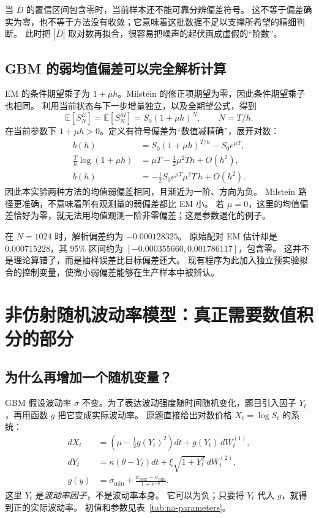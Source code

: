 \documentclass[11pt,a4paper,fontset=none]{ctexart}
\numberwithin{equation}{section}
\newcommand{\E}{\mathbb E}
\begin{document}
当 $\overline D$ 的置信区间包含零时，当前样本还不能可靠分辨偏差符号。
这不等于偏差确实为零，也不等于方法没有收敛；它意味着这批数据不足以支撑所希望的精细判断。
此时把 $|\overline D|$ 取对数再拟合，很容易把噪声的起伏画成虚假的“阶数”。

\subsection{GBM 的弱均值偏差可以完全解析计算}
EM 的条件期望乘子为 $1+\mu h$。Milstein 的修正项期望为零，因此条件期望乘子也相同。
利用当前状态与下一步增量独立，以及全期望公式，得到
\begin{equation}\label{eq:errors-discrete-mean}
 \E[S_N^{E}]=\E[S_N^{M}]=S_0(1+\mu h)^N,\qquad N=T/h.
\end{equation}
在当前参数下 $1+\mu h>0$。定义有符号偏差为“数值减精确”，展开对数：
\begin{align}
 b(h)&=S_0(1+\mu h)^{T/h}-S_0e^{\mu T},\label{eq:errors-bias-exact}\\
 \frac{T}{h}\log(1+\mu h)&=\mu T-\frac12\mu^2Th+O(h^2),\label{eq:errors-bias-log}\\
 b(h)&=-\frac12S_0e^{\mu T}\mu^2T\,h+O(h^2).\label{eq:errors-bias-order}
\end{align}
因此本实验两种方法的均值弱偏差相同，且渐近为一阶、方向为负。
Milstein 路径更准确，不意味着所有观测量的弱偏差都比 EM 小。
若 $\mu=0$，这里的均值偏差恰好为零，就无法用均值观测一阶非零偏差；这是参数退化的例子。

在 $N=1024$ 时，解析偏差约为 $-0.000128325$。
原始配对 EM 估计却是 $0.000715228$，其 95\% 区间约为 $[-0.000355660,0.001786117]$，包含零。
这并不是理论算错了，而是抽样误差比目标偏差还大。
现有程序为此加入独立预实验拟合的控制变量，使微小弱偏差能够在生产样本中被辨认。


\section{非仿射随机波动率模型：真正需要数值积分的部分}\label{sec:nonaffine}
\subsection{为什么再增加一个随机变量？}
GBM 假设波动率 $\sigma$ 不变。为了表达波动强度随时间随机变化，题目引入因子 $Y_t$，再用函数 $g$ 把它变成实际波动率。
原题直接给出对数价格 $X_t=\log S_t$ 的系统：
\begin{align}
 dX_t&=\left(\mu-\frac12g(Y_t)^2\right)dt+g(Y_t)\,dW_t^{(1)},\label{eq:na-x}\\
 dY_t&=\kappa(\theta-Y_t)dt+\xi\sqrt{1+Y_t^2}\,dW_t^{(2)},\label{eq:na-y}\\
 g(y)&=\sigma_{\min}+\frac{\sigma_{\max}-\sigma_{\min}}{1+e^{-y}}.\label{eq:na-logistic}
\end{align}
这里 $Y_t$ 是\emph{波动率因子}，不是波动率本身。
它可以为负；只要将 $Y_t$ 代入 $g$，就得到正的实际波动率。
初值和参数见表~\ref{tab:na-parameters}。
\end{document}
